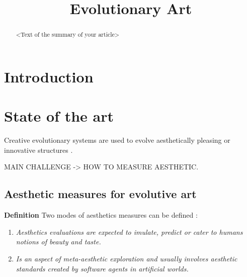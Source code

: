 \documentclass{llncs}
\title{Evolutionary Art}
\author{}
\begin{document}
\maketitle

\begin{abstract}
<Text of the summary of your article>
\end{abstract}

\section{Introduction}

\section{State of the art}

Creative evolutionary systems are used to evolve aesthetically pleasing or innovative structures \cite{dipaola2009incorporating}.

MAIN CHALLENGE -> HOW TO MEASURE AESTHETIC.

\subsection{Aesthetic measures for evolutive art}

{\bf Definition} Two modes of aesthetics measures can be defined \cite{galanter2012computational}: 

\begin{enumerate}
\item {\em Aesthetics evaluations are expected to imulate, predict or cater to humans notions of beauty and taste.} 
\item {\em Is an aspect of meta-aesthetic exploration and usually involves aesthetic standards created by software agents in artificial worlds.}
\end{enumerate}
\end{document}
